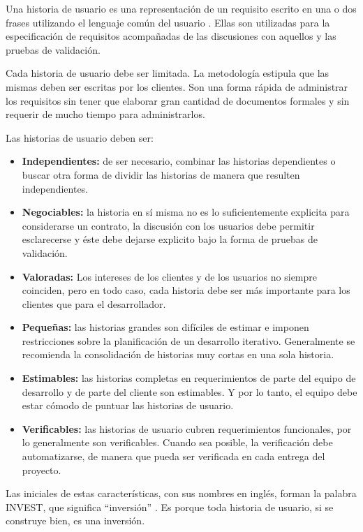 Una historia de usuario es una representación de un requisito escrito en una o dos frases utilizando el lenguaje común del usuario \citep{davis_agile_2015}. Ellas son utilizadas para la especificación de requisitos acompañadas de las discusiones con aquellos y las pruebas de validación.

Cada historia de usuario debe ser limitada. La metodología estipula que las mismas deben ser escritas por los clientes. Son una forma rápida de administrar los requisitos sin tener que elaborar gran cantidad de documentos formales y sin requerir de mucho tiempo para administrarlos.

Las historias de usuario deben ser:
\begin{itemize}
    \item \textbf{Independientes:} de ser necesario, combinar las historias dependientes o buscar otra forma de dividir las historias de manera que resulten independientes.
    \item \textbf{Negociables:} la historia en sí misma no es lo suficientemente explicita para considerarse un contrato, la discusión con los usuarios debe permitir esclarecerse y éste debe dejarse explicito bajo la forma de pruebas de validación.
    \item \textbf{Valoradas:} Los intereses de los clientes y de los usuarios no siempre coinciden, pero en todo caso, cada historia debe ser más importante para los clientes que para el desarrollador.
    \item \textbf{Pequeñas:} las historias grandes son difíciles de estimar e imponen restricciones sobre la planificación de un desarrollo iterativo. Generalmente se recomienda la consolidación de historias muy cortas en una sola historia.
    \item \textbf{Estimables:} las historias completas en requerimientos de parte del equipo de desarrollo y de parte del cliente son estimables. Y por lo tanto, el equipo debe estar cómodo de puntuar las historias de usuario.
    \item \textbf{Verificables:} las historias de usuario cubren requerimientos funcionales, por lo generalmente son verificables. Cuando sea posible, la verificación debe automatizarse, de manera que pueda ser verificada en cada entrega del proyecto.
\end{itemize}

Las iniciales de estas características, con sus nombres en inglés, forman la palabra INVEST, que significa “inversión” \citep{davis_agile_2015}. Es porque toda historia de usuario, si se construye bien, es una inversión.

